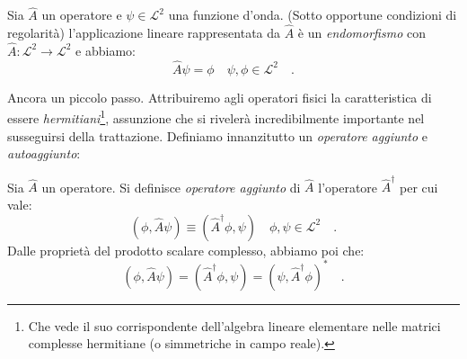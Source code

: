 \begin{teorema}
Sia $\hat{A}$ un operatore e $\psi \in \mathcal{L}^2$ una funzione d'onda. (Sotto opportune condizioni di regolarità) l'applicazione lineare rappresentata da $\hat{A}$ è un \emph{endomorfismo} con $\hat{A}: \mathcal{L}^2 \to \mathcal{L}^2$ e abbiamo: 
\[
    \hat{A} \psi = \phi \quad \psi,\phi \in \mathcal{L}^2 \quad.
\]
\end{teorema}
Ancora un piccolo passo. Attribuiremo agli operatori fisici la caratteristica di essere \emph{hermitiani}\footnote{Che vede il suo corrispondente dell'algebra lineare elementare nelle matrici complesse hermitiane (o simmetriche in campo reale).}, assunzione che si rivelerà incredibilmente importante nel susseguirsi della trattazione. Definiamo innanzitutto un \emph{operatore aggiunto} e \emph{autoaggiunto}:
\begin{definizione}
    Sia $\hat{A}$ un operatore. Si definisce \emph{operatore aggiunto} di $\hat{A}$ l'operatore $\hat{A}^{\dagger}$ per cui vale:
\[
    (\phi, \hat{A}\psi) \equiv (\hat{A}^{\dagger}\phi, \psi)\quad \phi, \psi \in \mathcal{L}^2 \quad.
\]
Dalle proprietà del prodotto scalare complesso, abbiamo poi che:
\[
    (\phi, \hat{A}\psi) = (\hat{A}^{\dagger}\phi, \psi) = (\psi, \hat{A}^{\dagger}\phi)^* \quad.
\]
\end{definizione}


